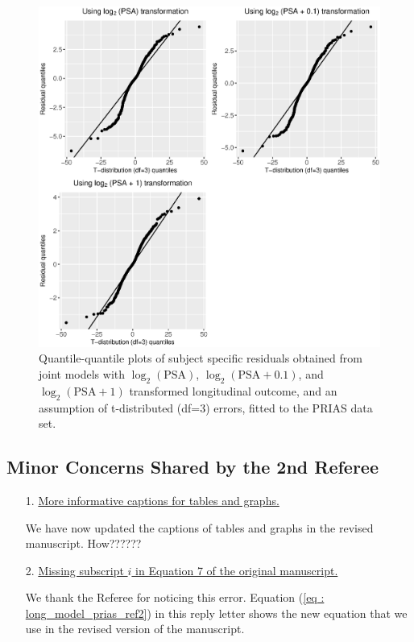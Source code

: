 \begin{enumerate}
    \begin{figure}[!htb]
    \centerline{\includegraphics[width=\columnwidth]{../images/model_fit/qqplot_various_log_transform_t3.eps}}
    \caption{Quantile-quantile plots of subject specific residuals obtained from joint models with $\log_2 (\mbox{PSA})$, $\log_2(\mbox{PSA}+0.1)$, and $\log_2(\mbox{PSA}+1)$ transformed longitudinal outcome, and an assumption of t-distributed (df=3) errors, fitted to the PRIAS data set.}
    \label{fig : qqplot_various_log_transform_t3}
    \end{figure}

    
\end{enumerate}

\subsection*{Minor Concerns Shared by the 2nd Referee}

\begin{enumerate}
    \item[1.] \underline{More informative captions for tables and graphs.}

    We have now updated the captions of tables and graphs in the revised manuscript. How??????
    
    \item[2.] \underline{Missing subscript $i$ in Equation 7 of the original manuscript.}

    We thank the Referee for noticing this error. Equation (\ref{eq : long_model_prias_ref2}) in this reply letter shows the new equation that we use in the revised version of the manuscript.

\end{enumerate}

